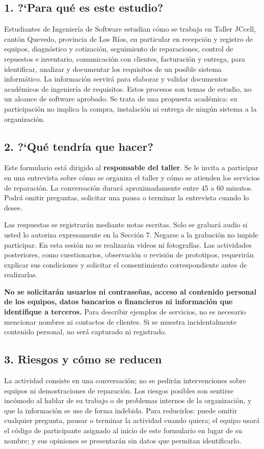 \subsection*{1. ?`Para qu\'e es este estudio?}
Estudiantes de Ingenier\'ia de Software estudian c\'omo se trabaja en Taller JC\textbar{}cell,
cant\'on Quevedo, provincia de Los R\'ios, en particular en recepci\'on y registro de equipos,
diagn\'ostico y cotizaci\'on, seguimiento de reparaciones, control de repuestos e inventario,
comunicaci\'on con clientes, facturaci\'on y entrega, para identificar, analizar y documentar los
requisitos de un posible sistema inform\'atico. La informaci\'on servir\'a para elaborar y validar
documentos acad\'emicos de ingenier\'ia de requisitos. Estos procesos son temas de estudio, no un
alcance de software aprobado. Se trata de una propuesta acad\'emica: su participaci\'on no implica
la compra, instalaci\'on ni entrega de ning\'un sistema a la organizaci\'on.

\subsection*{2. ?`Qu\'e tendr\'ia que hacer?}
Este formulario est\'a dirigido al \textbf{responsable del taller}. Se le invita a participar en
una entrevista sobre c\'omo se organiza el taller y c\'omo se atienden los servicios de
reparaci\'on. La conversaci\'on durar\'a aproximadamente entre 45 a 60 minutos. Podr\'a omitir
preguntas, solicitar una pausa o terminar la entrevista cuando lo desee.

Las respuestas se registrar\'an mediante notas escritas. Solo se grabar\'a audio si usted lo
autoriza expresamente en la Secci\'on 7. Negarse a la grabaci\'on no impide participar. En esta
sesi\'on no se realizar\'an videos ni fotograf\'ias. Las actividades posteriores, como
cuestionarios, observaci\'on o revisi\'on de prototipos, requerir\'an explicar sus condiciones y
solicitar el consentimiento correspondiente antes de realizarlas.

\textbf{No se solicitar\'an usuarios ni contrase\~nas, acceso al contenido personal de los equipos,
datos bancarios o financieros ni informaci\'on que identifique a terceros.} Para describir ejemplos
de servicios, no es necesario mencionar nombres ni contactos de clientes. Si se muestra
incidentalmente contenido personal, no ser\'a capturado ni registrado.

\subsection*{3. Riesgos y c\'omo se reducen}
La actividad consiste en una conversaci\'on; no se pedir\'an intervenciones sobre equipos ni
demostraciones de reparaci\'on. Los riesgos posibles son sentirse inc\'omodo al hablar de su trabajo
o de problemas internos de la organizaci\'on, y que la informaci\'on se use de forma indebida. Para
reducirlos: puede omitir cualquier pregunta, pausar o terminar la actividad cuando quiera; el
equipo usar\'a el c\'odigo de participante asignado al inicio de este formulario en lugar de su
nombre; y sus opiniones se presentar\'an sin datos que permitan identificarlo.

